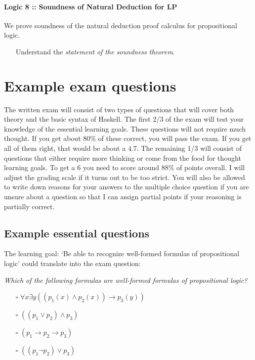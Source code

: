 \documentclass{article}[12pt]
\begin{document}
\paragraph{Logic 8 :: Soundness of Natural Deduction for LP} We prove soundness of the natural deduction proof calculus for propositional logic.
\begin{itemize}    
    \item[\twemoji{slightly smiling face}] Understand the \emph{statement of the soundness theorem}.
\end{itemize}

\section{Example exam questions}
The written exam will consist of two types of questions that will cover both theory and the basic syntax of Haskell. The first 2/3 of the exam will test your knowledge of the essential learning goals. These questions will not require much thought. If you get about 80\% of these correct, you will pass the exam. If you get all of them right, that would be about a $4.7$. The remaining 1/3 will consist of questions that either require more thinking or come from the food for thought learning goals. To get a $6$ you need to score around 88\% of points overall. I will adjust the grading scale if it turns out to be too strict. You will also be allowed to write down reasons for your answers to the multiple choice question if you are unsure about a question so that I can assign partial points if your reasoning is partially correct.

\subsection{Example essential questions}
The learning goal: `Be able to recognize well-formed formulas of propositional logic' could translate into the exam question:

\emph{Which of the following formulas are well-formed formulas of propositional logic?}
\begin{itemize}
    \item[$\square$] $\forall x \exists y ((p_1(x) \wedge p_2(x) ) \rightarrow p_3(y))$
    \item[$\square$] $ ((p_1 \vee p_2) \wedge p_3) $
    \item[$\square$] $ (p_1 \rightarrow p_2 \rightarrow p_3)$
    \item[$\square$] $ ((p_1 \neg p_2) \vee p_3 )$
\end{itemize}
\end{document}
